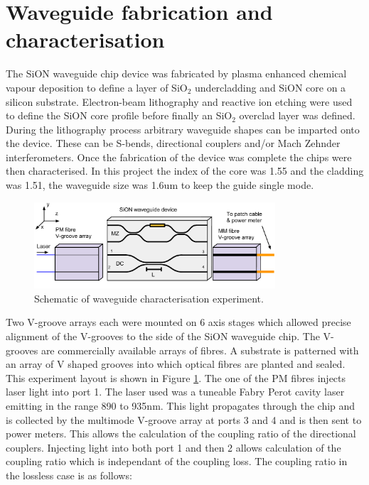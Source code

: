 \section{Waveguide fabrication and characterisation}

The SiON waveguide chip device was fabricated by plasma enhanced chemical vapour
deposition to define a layer of SiO$_2$ undercladding and SiON core on a silicon
substrate. Electron-beam lithography and reactive ion etching were used to
define the SiON core profile before finally an SiO$_2$ overclad layer was
defined. During the lithography process arbitrary waveguide shapes can be
imparted onto the device. These can be S-bends, directional couplers and/or Mach
Zehnder interferometers. Once the fabrication of the device was complete the
chips were then characterised. In this project the index of the core was 1.55
and the cladding was 1.51, the waveguide size was 1.6um to keep the guide single
mode.

\begin{figure}[h!] \begin{center}
\includegraphics[width=0.8\textwidth]{images/wg_char.pdf} \end{center}
\caption{Schematic of waveguide characterisation experiment.} \label{fig:6axis}
\end{figure}

Two V-groove arrays each were mounted on 6 axis stages which allowed precise
alignment of the V-grooves to the side of the SiON waveguide chip. The V-grooves
are commercially available arrays of fibres. A substrate is patterned with an
array of V shaped grooves into which optical fibres are planted and sealed. This
experiment layout is shown in Figure \ref{fig:6axis}. The one of the PM fibres
injects laser light into port 1. The laser used was a tuneable Fabry Perot
cavity laser emitting in the range 890 to 935nm. This light propagates through
the chip and is collected by the multimode V-groove array at ports 3 and 4 and
is then sent to power meters. This allows the calculation of the coupling ratio
of the directional couplers. Injecting light into both port 1 and then 2 allows
calculation of the coupling ratio which is independant of the coupling loss. The
coupling ratio in the lossless case is as follows:

